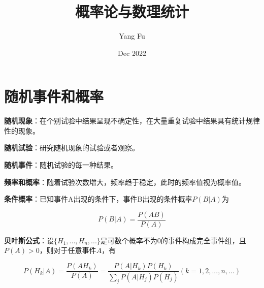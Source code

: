 \documentclass[11pt]{article}
\title{概率论与数理统计}
\author{Yang Fu}
\date{Dec 2022}
\begin{document}
\maketitle

\begin{abstract}

\end{abstract}

\section{随机事件和概率}

\textbf{随机现象}：在个别试验中结果呈现不确定性，在大量重复试验中结果具有统计规律性的现象。

\textbf{随机试验}：研究随机现象的试验或者观察。

\textbf{随机事件}：随机试验的每一种结果。

\textbf{频率和概率}：随着试验次数增大，频率趋于稳定，此时的频率值视为概率值。

\textbf{条件概率}：已知事件A出现的条件下，事件B出现的条件概率$P(B|A)$为

\begin{equation}\label{key}
	P(B|A) = \frac{P(AB)}{P(A)}
\end{equation}

\textbf{贝叶斯公式}：设$\{H_1, ..., H_n, ...\}$是可数个概率不为0的事件构成完全事件组，且$P(A)>0$，则对于任意事件$A$，有

\begin{equation}\label{key}
	P(H_k|A) = \frac{P(AH_k)}{P(A)} = \frac{P(A|H_k)P(H_k)}{\sum_jP(A|H_j)P(H_j)} (k=1, 2, ..., n, ...)
\end{equation}
\end{document}
